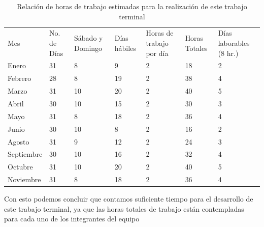 \documentclass[12pt, a4paper, titlepage]{report}
\begin{document}
    	    \begin{table}[H]
    			\begin{tabular}{|p{1.7cm}|p{1.6cm}||p{1.6cm}||p{1.6cm}||p{1.6cm}|p{1.6cm}|p{1.6cm}|}
    				\hline
    				\rowcolor{guindapoli}
    				\multicolumn{7}{|c|}{\textbf{\textcolor{white}{Horas a trabajar en el desarrollo del trabajo terminal}}}\\
    				\hline
    				\rowcolor{azulfuerte}Mes & No. de Días & Sábado y Domingo & Días h\'abiles & Horas de trabajo por día & Horas Totales & Días laborables (8 hr.)\\
    				\hline
    				\cellcolor{azulclaro}Enero & 31 & 8 & 9 & 2 & 18 & 2\\ 
    				\hline
    				\cellcolor{azulclaro}Febrero & 28 & 8 & 19 & 2 & 38 & 4\\ 
    				\hline
    				\cellcolor{azulclaro}Marzo & 31 & 10 & 20 & 2 & 40 & 5\\ 
    				\hline
    				\cellcolor{azulclaro}Abril & 30 & 10 & 15 & 2 & 30 & 3\\ 
    				\hline
    				\cellcolor{azulclaro}Mayo & 31 & 8 & 18 & 2 & 36 & 4\\
    				\hline
    				\cellcolor{azulclaro}Junio & 30 & 10 & 8 & 2 & 16 & 2\\
    				\hline
    				\cellcolor{azulclaro}Agosto & 31 & 9 & 12 & 2 & 24 & 3\\
    				\hline
    				\cellcolor{azulclaro}Septiembre & 30 & 10 & 16 & 2 & 32 & 4\\ 
    				\hline
    				\cellcolor{azulclaro}Octubre & 31 & 10 & 20 & 2 & 40 & 5\\ 
    				\hline
    				\cellcolor{azulclaro}Noviembre & 31 & 8 & 18 & 2 & 36 & 4\\ 
    				\hline
    			\end{tabular}
    		    \caption[Horas de trabajo]{Relación de horas de trabajo estimadas para la realización de este trabajo terminal}
    		\end{table}
    	    Con esto podemos concluir que contamos suficiente tiempo para el desarrollo de este trabajo terminal, ya que las horas totales de trabajo están contempladas para cada uno de los integrantes del equipo
    	    
\end{document}
